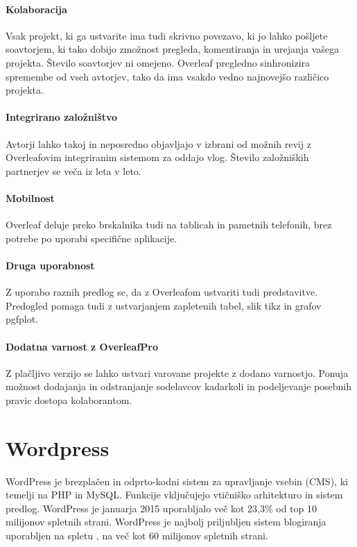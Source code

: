 \documentclass[a4paper, 12pt]{book}
\begin{document}
\paragraph{Kolaboracija}
Vsak projekt, ki ga ustvarite ima tudi skrivno povezavo, ki jo lahko pošljete soavtorjem, ki tako dobijo zmožnost pregleda, komentiranja in urejanja vašega projekta. Število soavtorjev ni omejeno. Overleaf pregledno sinhronizira spremembe od vseh avtorjev, tako da ima vsakdo vedno najnovejšo različico projekta.

\paragraph{Integrirano založništvo}
Avtorji lahko takoj in neposredno objavljajo v izbrani od možnih revij z Overleafovim integriranim sistemom za oddajo vlog. Število založniških partnerjev se veča iz leta v leto.

\paragraph{Mobilnost}
Overleaf deluje preko brskalnika tudi na tablicah in pametnih telefonih, brez potrebe po uporabi specifične aplikacije.

\paragraph{Druga uporabnost}
Z uporabo raznih predlog se, da z Overleafom ustvariti tudi predstavitve. Predogled pomaga tudi z ustvarjanjem zapletenih tabel, slik tikz in grafov pgfplot.

\paragraph{Dodatna varnost z OverleafPro}
Z plačljivo verzijo se lahko ustvari varovane projekte z dodano varnostjo. Ponuja možnost dodajanja in odstranjanje sodelavcov kadarkoli in podeljevanje posebnih pravic dostopa kolaborantom.


\section{Wordpress}
\label{wordpress}

WordPress je brezplačen in odprto-kodni sistem za upravljanje vsebin (CMS), ki temelji na PHP in MySQL. \cite{83} Funkcije vključujejo vtičniško arhitekturo in sistem predlog. WordPress je januarja 2015 uporabljalo več kot 23,3\% od top 10 milijonov spletnih strani. \cite{84} WordPress je najbolj priljubljen sistem blogiranja uporabljen na spletu \cite{85}, na več kot 60 milijonov spletnih strani. \cite{86}
\end{document}
